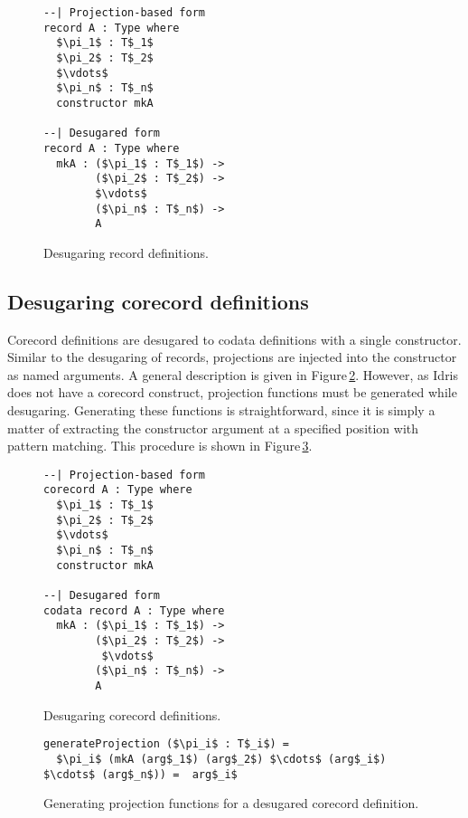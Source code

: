 \begin{figure}
\begin{lstlisting}[mathescape]
--| Projection-based form
record A : Type where
  $\pi_1$ : T$_1$
  $\pi_2$ : T$_2$
  $\vdots$
  $\pi_n$ : T$_n$
  constructor mkA

--| Desugared form
record A : Type where
  mkA : ($\pi_1$ : T$_1$) ->
        ($\pi_2$ : T$_2$) ->
        $\vdots$
        ($\pi_n$ : T$_n$) ->
        A
\end{lstlisting}
\caption{Desugaring record definitions.}
\label{fig:desugar_records}
\end{figure}

\subsection{Desugaring corecord definitions}

Corecord definitions are desugared to codata definitions with a single constructor. Similar to the desugaring of records, projections are injected into the constructor as named arguments. A general description is given in Figure\,\ref{fig:desugar_corecords}. However, as Idris does not have a corecord construct, projection functions must be generated while desugaring. Generating these functions is straightforward, since it is simply a matter of extracting the constructor argument at a specified position with pattern matching. This procedure is shown in Figure\,\ref{fig:generate_projections}.

\begin{figure}
\begin{lstlisting}[mathescape]
--| Projection-based form
corecord A : Type where
  $\pi_1$ : T$_1$
  $\pi_2$ : T$_2$
  $\vdots$
  $\pi_n$ : T$_n$
  constructor mkA

--| Desugared form
codata record A : Type where
  mkA : ($\pi_1$ : T$_1$) ->
        ($\pi_2$ : T$_2$) ->
         $\vdots$
        ($\pi_n$ : T$_n$) ->
        A
\end{lstlisting}
\caption{Desugaring corecord definitions.}
\label{fig:desugar_corecords}
\end{figure}


\begin{figure}
\begin{lstlisting}[mathescape]
generateProjection ($\pi_i$ : T$_i$) =
  $\pi_i$ (mkA (arg$_1$) (arg$_2$) $\cdots$ (arg$_i$) $\cdots$ (arg$_n$)) =  arg$_i$
\end{lstlisting}
\caption{Generating projection functions for a desugared corecord definition.}
\label{fig:generate_projections}
\end{figure}

